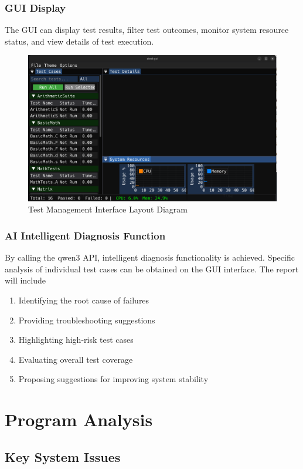 \documentclass{article}
\begin{document}
\subsubsection{GUI Display}
The GUI can display test results, filter test outcomes, monitor system resource status, and view details of test execution.
\begin{figure}[H]
    \centering
    \includegraphics[width=\textwidth]{img/gui.png}
    \caption{Test Management Interface Layout Diagram}
    \label{fig:gui}
    \small
\end{figure}
\subsubsection{AI Intelligent Diagnosis Function}
By calling the qwen3 API, intelligent diagnosis functionality is achieved. Specific analysis of individual test cases can be obtained on the GUI interface. The report will include
\begin{enumerate}
    \item Identifying the root cause of failures
    \item Providing troubleshooting suggestions
    \item Highlighting high-risk test cases
    \item Evaluating overall test coverage
    \item Proposing suggestions for improving system stability
\end{enumerate}
\newpage
\section{Program Analysis}
\subsection{Key System Issues}
\end{document}
